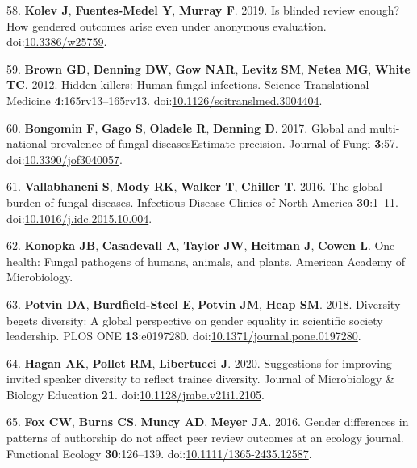 \documentclass[11pt,]{article}
\begin{document}
\hypertarget{ref-Kolev2019}{}
58. \textbf{Kolev J}, \textbf{Fuentes-Medel Y}, \textbf{Murray F}. 2019.
Is blinded review enough? How gendered outcomes arise even under
anonymous evaluation.
doi:\href{https://doi.org/10.3386/w25759}{10.3386/w25759}.

\hypertarget{ref-Brown2012}{}
59. \textbf{Brown GD}, \textbf{Denning DW}, \textbf{Gow NAR},
\textbf{Levitz SM}, \textbf{Netea MG}, \textbf{White TC}. 2012. Hidden
killers: Human fungal infections. Science Translational Medicine
\textbf{4}:165rv13--165rv13.
doi:\href{https://doi.org/10.1126/scitranslmed.3004404}{10.1126/scitranslmed.3004404}.

\hypertarget{ref-Bongomin2017}{}
60. \textbf{Bongomin F}, \textbf{Gago S}, \textbf{Oladele R},
\textbf{Denning D}. 2017. Global and multi-national prevalence of fungal
diseasesEstimate precision. Journal of Fungi \textbf{3}:57.
doi:\href{https://doi.org/10.3390/jof3040057}{10.3390/jof3040057}.

\hypertarget{ref-Vallabhaneni2016}{}
61. \textbf{Vallabhaneni S}, \textbf{Mody RK}, \textbf{Walker T},
\textbf{Chiller T}. 2016. The global burden of fungal diseases.
Infectious Disease Clinics of North America \textbf{30}:1--11.
doi:\href{https://doi.org/10.1016/j.idc.2015.10.004}{10.1016/j.idc.2015.10.004}.

\hypertarget{ref-ASM_2019}{}
62. \textbf{Konopka JB}, \textbf{Casadevall A}, \textbf{Taylor JW},
\textbf{Heitman J}, \textbf{Cowen L}. One health: Fungal pathogens of
humans, animals, and plants. American Academy of Microbiology.

\hypertarget{ref-potvin_diversity_2018}{}
63. \textbf{Potvin DA}, \textbf{Burdfield-Steel E}, \textbf{Potvin JM},
\textbf{Heap SM}. 2018. Diversity begets diversity: A global perspective
on gender equality in scientific society leadership. PLOS ONE
\textbf{13}:e0197280.
doi:\href{https://doi.org/10.1371/journal.pone.0197280}{10.1371/journal.pone.0197280}.

\hypertarget{ref-Hagan2020}{}
64. \textbf{Hagan AK}, \textbf{Pollet RM}, \textbf{Libertucci J}. 2020.
Suggestions for improving invited speaker diversity to reflect trainee
diversity. Journal of Microbiology \& Biology Education \textbf{21}.
doi:\href{https://doi.org/10.1128/jmbe.v21i1.2105}{10.1128/jmbe.v21i1.2105}.

\hypertarget{ref-fox_gender_2016}{}
65. \textbf{Fox CW}, \textbf{Burns CS}, \textbf{Muncy AD}, \textbf{Meyer
JA}. 2016. Gender differences in patterns of authorship do not affect
peer review outcomes at an ecology journal. Functional Ecology
\textbf{30}:126--139.
doi:\href{https://doi.org/10.1111/1365-2435.12587}{10.1111/1365-2435.12587}.
\end{document}
